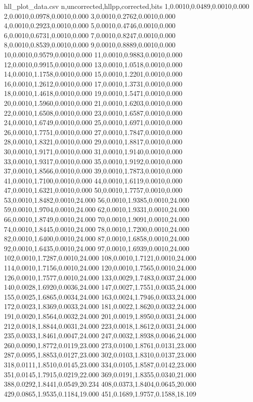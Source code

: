 \begin{filecontents*}{hll_plot_data.csv}
n,uncorrected,hllpp,corrected,bits
1,0.0010,0.0489,0.0010,0.000
2,0.0010,0.0978,0.0010,0.000
3,0.0010,0.2762,0.0010,0.000
4,0.0010,0.2923,0.0010,0.000
5,0.0010,0.4746,0.0010,0.000
6,0.0010,0.6731,0.0010,0.000
7,0.0010,0.8247,0.0010,0.000
8,0.0010,0.8539,0.0010,0.000
9,0.0010,0.8889,0.0010,0.000
10,0.0010,0.9579,0.0010,0.000
11,0.0010,0.9883,0.0010,0.000
12,0.0010,0.9915,0.0010,0.000
13,0.0010,1.0518,0.0010,0.000
14,0.0010,1.1758,0.0010,0.000
15,0.0010,1.2201,0.0010,0.000
16,0.0010,1.2612,0.0010,0.000
17,0.0010,1.3731,0.0010,0.000
18,0.0010,1.4618,0.0010,0.000
19,0.0010,1.5471,0.0010,0.000
20,0.0010,1.5960,0.0010,0.000
21,0.0010,1.6203,0.0010,0.000
22,0.0010,1.6508,0.0010,0.000
23,0.0010,1.6587,0.0010,0.000
24,0.0010,1.6749,0.0010,0.000
25,0.0010,1.6971,0.0010,0.000
26,0.0010,1.7751,0.0010,0.000
27,0.0010,1.7847,0.0010,0.000
28,0.0010,1.8321,0.0010,0.000
29,0.0010,1.8817,0.0010,0.000
30,0.0010,1.9171,0.0010,0.000
31,0.0010,1.9140,0.0010,0.000
33,0.0010,1.9317,0.0010,0.000
35,0.0010,1.9192,0.0010,0.000
37,0.0010,1.8566,0.0010,0.000
39,0.0010,1.7873,0.0010,0.000
41,0.0010,1.7100,0.0010,0.000
44,0.0010,1.6119,0.0010,0.000
47,0.0010,1.6321,0.0010,0.000
50,0.0010,1.7757,0.0010,0.000
53,0.0010,1.8482,0.0010,24.000
56,0.0010,1.9385,0.0010,24.000
59,0.0010,1.9704,0.0010,24.000
62,0.0010,1.9331,0.0010,24.000
66,0.0010,1.8749,0.0010,24.000
70,0.0010,1.9091,0.0010,24.000
74,0.0010,1.8445,0.0010,24.000
78,0.0010,1.7200,0.0010,24.000
82,0.0010,1.6400,0.0010,24.000
87,0.0010,1.6858,0.0010,24.000
92,0.0010,1.6435,0.0010,24.000
97,0.0010,1.6939,0.0010,24.000
102,0.0010,1.7287,0.0010,24.000
108,0.0010,1.7121,0.0010,24.000
114,0.0010,1.7156,0.0010,24.000
120,0.0010,1.7565,0.0010,24.000
126,0.0010,1.7577,0.0010,24.000
133,0.0029,1.7483,0.0037,24.000
140,0.0028,1.6920,0.0036,24.000
147,0.0027,1.7551,0.0035,24.000
155,0.0025,1.6865,0.0034,24.000
163,0.0024,1.7946,0.0033,24.000
172,0.0023,1.8369,0.0033,24.000
181,0.0022,1.8620,0.0032,24.000
191,0.0020,1.8564,0.0032,24.000
201,0.0019,1.8950,0.0031,24.000
212,0.0018,1.8844,0.0031,24.000
223,0.0018,1.8612,0.0031,24.000
235,0.0033,1.8461,0.0047,24.000
247,0.0032,1.8938,0.0046,24.000
260,0.0090,1.8772,0.0119,23.000
273,0.0100,1.8761,0.0131,23.000
287,0.0095,1.8853,0.0127,23.000
302,0.0103,1.8310,0.0137,23.000
318,0.0111,1.8510,0.0145,23.000
334,0.0105,1.8587,0.0142,23.000
351,0.0145,1.7915,0.0219,22.000
369,0.0191,1.8355,0.0340,21.000
388,0.0292,1.8441,0.0549,20.234
408,0.0373,1.8404,0.0645,20.000
429,0.0865,1.9535,0.1184,19.000
451,0.1689,1.9757,0.1588,18.109

\end{filecontents*}
